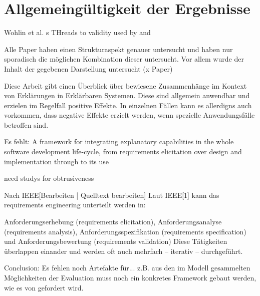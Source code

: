 \section{Allgemeingültigkeit der Ergebnisse}

Wohlin et al. s THreads to validity \cite{wohlin2012experimentation} used by \cite{ghazi2016exploratory} and \cite{carvalho2020developers}

Alle Paper haben einen Strukturaspekt genauer untersucht und haben nur sporadisch die möglichen Kombination dieser untersucht. Vor allem wurde der Inhalt der gegebenen Darstellung untersucht (x Paper)

Diese Arbeit gibt einen Überblick über bewiesene Zusammenhänge im Kontext von Erklärungen in Erklärbaren Systemen. Diese sind allgemein anwendbar und erzielen im Regelfall positive Effekte. In einzelnen Fällen kann es allerdigns auch vorkommen, dass negative Effekte erzielt werden, wenn spezielle Anwendungsfälle betroffen sind.

Es fehlt: A framework for integrating explanatory capabilities in the whole software development life-cycle, from requirements elicitation over design and implementation through to its use \cite{cassens_ambient_2019}

need studys for obtrusiveness \cite{lim_2009_assessing}

Nach IEEE[Bearbeiten | Quelltext bearbeiten]
Laut IEEE[1] kann das requirements engineering unterteilt werden in:

Anforderungserhebung (requirements elicitation),
Anforderungsanalyse (requirements analysis),
Anforderungsspezifikation (requirements specification) und
Anforderungsbewertung (requirements validation)
Diese Tätigkeiten überlappen einander und werden oft auch mehrfach – iterativ – durchgeführt.

Conclusion: Es fehlen noch Artefakte für... z.B. aus den im Modell gesammelten Möglichkeiten der Evaluation muss noch ein konkretes Framework gebaut werden, wie es von \citeauthor{sokol_explainability_2020} gefordert wird.
